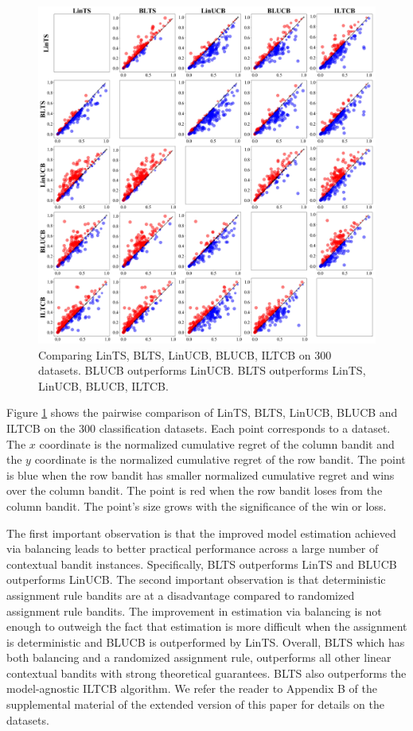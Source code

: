 \documentclass[letterpaper]{article} %
\begin{document}
\begin{figure}[!htb]
\centering
\includegraphics[width=0.95\columnwidth]{Figures/all_vs_all}
\caption{Comparing LinTS, BLTS, LinUCB, BLUCB, ILTCB on 300 datasets. BLUCB outperforms LinUCB. BLTS outperforms LinTS, LinUCB, BLUCB, ILTCB.}
\label{fig:all_vs_all}
\end{figure}

Figure \ref{fig:all_vs_all} shows the pairwise comparison of LinTS, BLTS, LinUCB, BLUCB and ILTCB on the 300 classification datasets. Each point corresponds to a dataset. The $x$ coordinate is the normalized cumulative regret of the column bandit and the $y$ coordinate is the normalized cumulative regret of the row bandit. The point is blue when the row bandit has smaller normalized cumulative regret and wins over the column bandit. The point is red when the row bandit loses from the column bandit. The point's size grows with the significance of the win or loss.

The first important observation is that the improved model estimation achieved via balancing leads to better practical performance across a large number of contextual bandit instances. Specifically, BLTS outperforms LinTS and BLUCB outperforms LinUCB.
The second important observation is that deterministic assignment rule bandits are at a disadvantage compared to randomized assignment rule bandits. The improvement in estimation via balancing is not enough to outweigh the fact that estimation is more difficult when the assignment is deterministic and BLUCB is outperformed by LinTS.
Overall, BLTS which has both balancing and a randomized assignment rule, outperforms all other linear contextual bandits with strong theoretical guarantees.
BLTS also outperforms the model-agnostic ILTCB algorithm.
We refer the reader to Appendix B of the supplemental material of the extended version of this paper \cite{dimakopoulou2017estimation} for details on the datasets.
\end{document}

